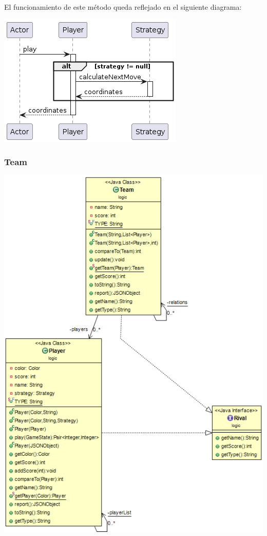 \documentclass[12pt,a4paper,openright]{book}
\theoremstyle{break}
\begin{document}
El funcionamiento de este método queda reflejado en el siguiente diagrama:

\begin{center}
\includegraphics[scale=0.75]{Player.play()-sprint7.png} 
\end{center}

\newpage

\subsubsection{Team}

\begin{center}
\includegraphics[scale=0.75]{Team-sprint7.png} 
\end{center}
\end{document}
